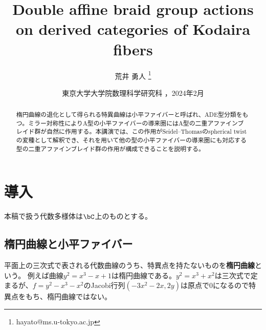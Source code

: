 \documentclass[a4j,uplatex,dvipdfmx]{jsarticle}
\title{%
Double affine braid group actions on derived categories of Kodaira fibers%
}
\author{%
荒井 勇人
\footnote{%
hayato@ms.u-tokyo.ac.jp%
}}
\date{%
東京大学大学院数理科学研究科%
，2024年2月%
}
\numberwithin{equation}{section}
\numberwithin{figure}{section}
\theoremstyle{definition}
\begin{document}
\pagestyle{empty}
\maketitle
\thispagestyle{empty}

\begin{abstract}   %
    楕円曲線の退化として得られる特異曲線は小平ファイバーと呼ばれ、ADE型分類をもつ。ミラー対称性によりA型の小平ファイバーの導来圏にはA型の二重アファインブレイド群が自然に作用する。本講演では、この作用がSeidel--Thomasのspherical twistの変種として解釈でき、それを用いて他の型の小平ファイバーの導来圏にも対応する型の二重アファインブレイド群の作用が構成できることを説明する。
\end{abstract}
\section{導入}
本稿で扱う代数多様体は$\bC$上のものとする。
\subsection{楕円曲線と小平ファイバー}

平面上の三次式で表される代数曲線のうち、特異点を持たないものを\textbf{楕円曲線}という。
例えば曲線$y^2 = x^3 - x + 1$は楕円曲線である。$y^2 = x^3 + x^2$は三次式で定まるが、$f = y^2-x^3 - x^2$のJacobi行列$(-3x^2-2x, 2y)$は原点で$0$になるので特異点をもち、楕円曲線ではない。
\end{document}
